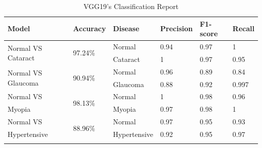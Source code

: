 \begin{table} [H]
\caption{VGG19's Classification Report}
\centering
\begin{tabular}{|l|l|l|l|l|l|} 
\hline
Model                               & Accuracy                 & Disease              & Precision            & F1-score             & Recall                \\ 
\hline
\multirow{2}{*}{Normal VS Cataract} & \multirow{2}{*}{97.24\%} & Normal               & 0.94                 & 0.97                 & 1                     \\ 
\cline{3-6}
                                    &                          & Cataract             & 1                    & 0.97                 & 0.95                  \\ 
\hline
\multirow{2}{*}{Normal VS Glaucoma} & \multirow{2}{*}{90.94\%} & Normal               & 0.96                 & 0.89                 & 0.84                  \\ 
\cline{3-6}
                                    &                          & Glaucoma             & 0.88                 & 0.92                 & 0.997                 \\ 
\hline
Normal VS                           & \multirow{2}{*}{98.13\%} & Normal               & 1                    & 0.98                 & 0.96                  \\ 
\cline{3-6}
Myopia                              &                          & Myopia               & 0.97                 & 0.98                 & 1                     \\ 
\hline
Normal VS                           & \multirow{2}{*}{88.96\%} & Normal               & 0.97                 & 0.95                 & 0.93                  \\ 
\cline{3-6}
Hypertensive                        &                          & Hypertensive         & 0.92                 & 0.95                 & 0.97                  \\ 
\hline
\multicolumn{1}{l}{}                & \multicolumn{1}{l}{}     & \multicolumn{1}{l}{} & \multicolumn{1}{l}{} & \multicolumn{1}{l}{} & \multicolumn{1}{l}{} 
\end{tabular}
\end{table}
